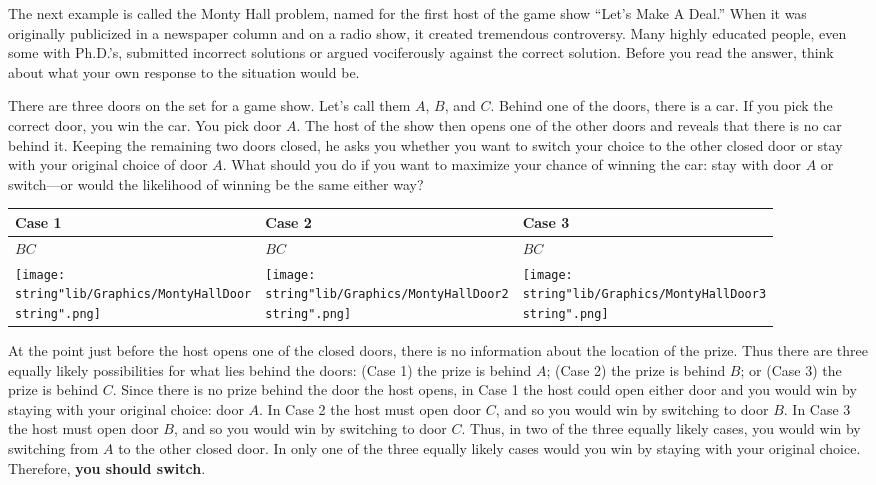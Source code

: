 \documentclass[11pt,a4paper]{book}
\begin{document}
The next example is called the Monty Hall problem, named for the first
host of the game show \textquotedblleft Let\textquoteright s Make
A Deal.\textquotedblright{} When it was originally publicized in a
newspaper column and on a radio show, it created tremendous controversy.
Many highly educated people, even some with Ph.D.\textquoteright s,
submitted incorrect solutions or argued vociferously against the correct
solution. Before you read the answer, think about what your own response
to the situation would be.

\begin{example}

There are three doors on the set for a game show. Let\textquoteright s
call them $A$, $B$, and $C$. Behind one of the doors, there is
a car. If you pick the correct door, you win the car. You pick door
$A$. The host of the show then opens one of the other doors and reveals
that there is no car behind it. Keeping the remaining two doors closed,
he asks you whether you want to switch your choice to the other closed
door or stay with your original choice of door $A$. What should you
do if you want to maximize your chance of winning the car: stay with
door $A$ or switch---or would the likelihood of winning be the same
either way?

\Solution

\begin{center}
\setlength{\extrarowheight}{2pt}%
\begin{tabular}{|>{\centering}p{4cm}|>{\centering}p{4cm}|>{\centering}p{4cm}|}
\hline
Case 1 & Case 2 & Case 3\tabularnewline
\hline
$B$\hspace{1.3cm}$C$ & $B$\hspace{1.3cm}$C$ & $B$\hspace{1.3cm}$C$\tabularnewline
\texttt{[image: \\string"lib/Graphics/MontyHallDoor\\string".png]} & \texttt{[image: \\string"lib/Graphics/MontyHallDoor2\\string".png]} & \texttt{[image: \\string"lib/Graphics/MontyHallDoor3\\string".png]}\tabularnewline
\hline
\end{tabular}
\par\end{center}

At the point just before the host opens one of the closed doors, there
is no information about the location of the prize. Thus there are
three equally likely possibilities for what lies behind the doors:
(Case 1) the prize is behind $A$; (Case 2) the prize is behind $B$;
or (Case 3) the prize is behind $C$. Since there is no prize behind
the door the host opens, in Case 1 the host could open either door
and you would win by staying with your original choice: door $A$.
In Case 2 the host must open door $C$, and so you would win by switching
to door $B$. In Case 3 the host must open door $B$, and so you would
win by switching to door $C$. Thus, in two of the three equally likely
cases, you would win by switching from $A$ to the other closed door.
In only one of the three equally likely cases would you win by staying
with your original choice. Therefore, \textbf{you should switch}.
\end{example}
\end{document}
